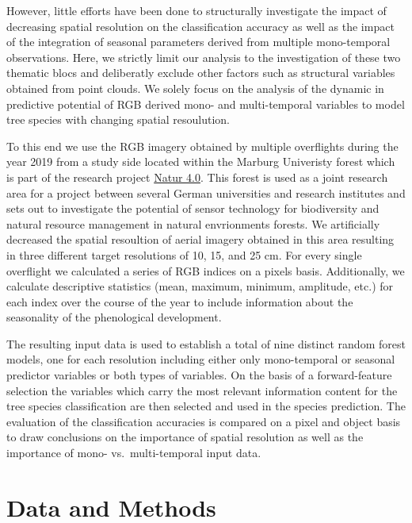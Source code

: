 \documentclass[]{article}
\begin{document}
However, little efforts have been done to structurally investigate the
impact of decreasing spatial resolution on the classification accuracy
as well as the impact of the integration of seasonal parameters derived
from multiple mono-temporal observations. Here, we strictly limit our
analysis to the investigation of these two thematic blocs and
deliberatly exclude other factors such as structural variables obtained
from point clouds. We solely focus on the analysis of the dynamic in
predictive potential of RGB derived mono- and multi-temporal variables
to model tree species with changing spatial resoulution.

To this end we use the RGB imagery obtained by multiple overflights
during the year 2019 from a study side located within the Marburg
Univeristy forest which is part of the research project
\href{https://www.uni-marburg.de/en/fb19/natur40/}{Natur 4.0}. This
forest is used as a joint research area for a project between several
German universities and research institutes and sets out to investigate
the potential of sensor technology for biodiversity and natural resource
management in natural envrionments forests. We artificially decreased
the spatial resoultion of aerial imagery obtained in this area resulting
in three different target resolutions of 10, 15, and 25 cm. For every
single overflight we calculated a series of RGB indices on a pixels
basis. Additionally, we calculate descriptive statistics (mean, maximum,
minimum, amplitude, etc.) for each index over the course of the year to
include information about the seasonality of the phenological
development.

The resulting input data is used to establish a total of nine distinct
random forest models, one for each resolution including either only
mono-temporal or seasonal predictor variables or both types of
variables. On the basis of a forward-feature selection the variables
which carry the most relevant information content for the tree species
classification are then selected and used in the species prediction. The
evaluation of the classification accuracies is compared on a pixel and
object basis to draw conclusions on the importance of spatial resolution
as well as the importance of mono- vs.~multi-temporal input data.

\hypertarget{data-and-methods}{%
\section{Data and Methods}\label{data-and-methods}}
\end{document}
